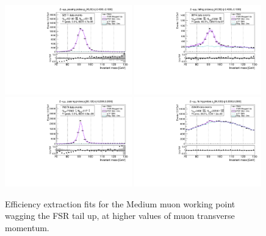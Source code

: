 \begin{figure}
\centering
\includegraphics[width=0.49\textwidth]{figures/Zmm_WagFsrUp_BkgLPi_pass_ptBin7_etaBin0.pdf}
\includegraphics[width=0.49\textwidth]{figures/Zmm_WagFsrUp_BkgLPi_fail_ptBin7_etaBin0.pdf}
\includegraphics[width=0.49\textwidth]{figures/Zmm_WagFsrUp_BkgLPi_pass_ptBin10_etaBin6.pdf}
\includegraphics[width=0.49\textwidth]{figures/Zmm_WagFsrUp_BkgLPi_fail_ptBin10_etaBin6.pdf}
\caption{Efficiency extraction fits for the Medium muon working point wagging the FSR tail up, at higher values of muon transverse momentum.}
\label{fig:ZmmAltSigFSRFits2}
\end{figure}

